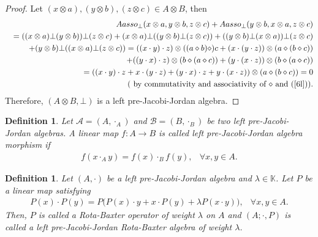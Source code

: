 \documentclass[12pt]{amsart}
\newtheorem{definition}[Theorem]{Definition}
\begin{document}
	\begin{proof}
		Let $ (x\otimes a),(y\otimes b),(z\otimes c)\in A\otimes B$, then
		\begin{eqnarray}
			&& Aasso_{\bot}(x\otimes a,y\otimes b,z\otimes c)+Aasso_{\bot}(y\otimes b,x\otimes a,z\otimes c)\nonumber\\
			&&=((x\otimes a)\bot (y\otimes b))\bot(z\otimes c)+(x\otimes a)\bot ((y\otimes b)\bot(z\otimes c))+((y\otimes b)\bot (x\otimes a))\bot(z\otimes c)\nonumber\\
			&&+(y\otimes b)\bot ((x\otimes a)\bot(z\otimes c))=((x\cdot y)\cdot z)\otimes((a\diamond b)\diamond)c+(x\cdot(y\cdot z))\otimes(a \diamond(b\diamond c))\nonumber\\
			&&+((y\cdot x)\cdot z)\otimes(b\diamond(a\diamond c))
			+(y\cdot(x\cdot z))\otimes(b\diamond(a\diamond c))
			\nonumber\\
			&&=((x\cdot y)\cdot z+x\cdot(y\cdot z)+(y\cdot x)\cdot z+y\cdot(x\cdot z))\otimes(a\diamond(b\diamond c))=0\nonumber\\
			&&\mbox{( by commutativity and associativity of $\diamond$ and (\ref{6l})).}\nonumber
		\end{eqnarray} 
		Therefore, $ (A\otimes B,\bot) $ is a left pre-Jacobi-Jordan algebra.
	\end{proof}
	\begin{definition}\label{D5}
		Let $ \mathcal{A}=(A,\cdot_A) $ and $\mathcal{B}=(B,\cdot_B) $ be two left pre-Jacobi-Jordan algebras. A linear map $ f : A\to B$ is called left  pre-Jacobi-Jordan algebra morphism if
		\begin{eqnarray}
			\label{16}
			f(x\cdot_A y)=f(x)\cdot_B f(y),&\forall x,y\in A.
		\end{eqnarray}
	\end{definition}
	\begin{definition}\label{D6}
		Let $ (A,\cdot) $ be a left pre-Jacobi-Jordan algebra and $ \lambda\in \mathbb{K} $. Let $ P $ be a linear map satisfying
		\begin{eqnarray}
			\label{11}
			P(x)\cdot P(y)=P\bigg(P(x)\cdot y+x\cdot P(y) +\lambda P(x\cdot y)\bigg),& \forall x,y\in A.
		\end{eqnarray}
		Then, $ P $ is called a Rota-Baxter operator of weight $ \lambda $ on $ A $ and
		$ (A;\cdot, P) $ is called a  left pre-Jacobi-Jordan Rota-Baxter algebra of weight $ \lambda $.	
	\end{definition}
\end{document}
